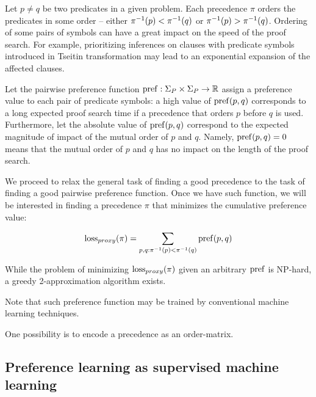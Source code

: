 Let \(p \neq q\) be two predicates in a given \gls{problem}.
Each precedence \(\pi\) orders the predicates in some order --
either \(\pi^{-1}(p) < \pi^{-1}(q)\) or \(\pi^{-1}(p) > \pi^{-1}(q)\).
Ordering of some pairs of symbols can have a great impact on the speed of the proof search.
For example, prioritizing inferences on clauses with predicate symbols
introduced in Tseitin transformation
may lead to an exponential expansion of the affected clauses.

Let the pairwise preference
function \(\operatorname{pref} : \Sigma_P \times \Sigma_P \rightarrow \operatorname{\mathbb{R}}\)
assign a preference value to each pair of predicate symbols:
a high value of \(\operatorname{pref}(p, q)\) corresponds to a long expected proof search time
if a precedence that orders \(p\) before \(q\) is used.
Furthermore, let the absolute value of \(\operatorname{pref}(p, q)\)
correspond to the expected magnitude of impact of the mutual order of \(p\) and \(q\).
Namely, \(\operatorname{pref}(p, q) = 0\) means that the mutual order of \(p\) and \(q\)
has no impact on the length of the proof search.

We proceed to relax the general task of finding a good precedence
to the task of finding a good pairwise preference function.
Once we have such function,
we will be interested in finding a precedence \(\pi\) that minimizes the cumulative preference value:

\begin{align*}
\operatorname{loss}_{proxy}(\pi) = \sum_{p, q: \pi^{-1}(p) < \pi^{-1}(q)} \operatorname{pref}(p, q)
\end{align*}

While the problem of minimizing \(\operatorname{loss}_{proxy}(\pi)\) given an arbitrary \(\operatorname{pref}\) is NP-hard,
a greedy 2-approximation algorithm exists.\cite{Cohen2011}

Note that such preference function may be trained by conventional machine learning techniques.

One possibility is to encode a precedence as an \gls{order-matrix}.

\subsection{Preference learning as supervised machine learning}

